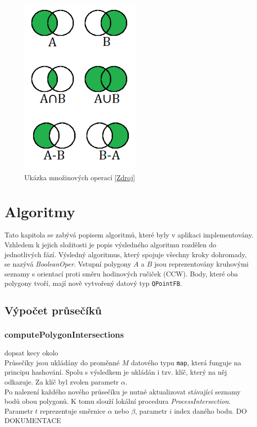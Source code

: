 \documentclass[a4paper, 12pt]{article}
\begin{document}
\begin{figure}[h!]
	\centering
	\includegraphics[width=6cm]{./pictures/operations.png}
	\caption{Ukázka množinových operací [\href{http://www.efgh.com/math/algebra/sets.htm}{Zdroj}]}
\end{figure}

\section{Algoritmy}
Tato kapitola se zabývá popisem algoritmů, které byly v aplikaci implementovány. Vzhledem k jejich složitosti je popis výsledného algoritmu rozdělen do jednotlivých fází. Výsledný algoritmus, který spojuje všechny kroky dohromady, se nazývá \textit{BooleanOper}. Vstupní polygony $A$ a $B$ jsou reprezentovány kruhovými seznamy s orientací proti směru hodinových ručiček (CCW). Body, které oba polygony tvoří, mají nově vytvořený datový typ \texttt{QPointFB}.

\subsection{Výpočet průsečíků}
\subsubsection{computePolygonIntersections}
dopsat kecy okolo\\
Průsečíky jsou ukládány do proměnné $M$ datového typu \texttt{map}, která funguje na principu hashování. Spolu s výsledkem je ukládán i tzv. klíč, který na něj odkazuje. Za klíč byl zvolen parametr $\alpha$.\\

Po nalezení každého nového průsečíku je nutné aktualizovat stávající seznamy bodů obou polygonů. K tomu slouží lokální procedura \textit{ProcessIntersection}. Parametr $t$ reprezentuje směrnice $\alpha$ nebo $\beta$, parametr $i$ index daného bodu. DO DOKUMENTACE\\
\end{document}
